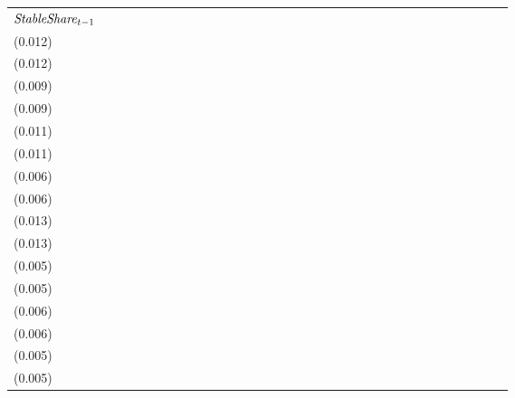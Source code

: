 \begin{tabular}{lllllllllllllllllllllllllllllllll}
${{\it StableShare}}_{t-1}$  &                                     &                                     &   \makecell{$0.671^{**}$ \\(0.012)} &   \makecell{$0.673^{**}$ \\(0.012)} &                                    &                                    &   \makecell{$0.169^{**}$ \\(0.009)} &   \makecell{$0.169^{**}$ \\(0.009)} &                                     &                                     &  \makecell{$-0.040^{**}$ \\(0.011)} &  \makecell{$-0.041^{**}$ \\(0.011)} &                                     &                                     &    \makecell{$-0.007^{}$ \\(0.006)} &    \makecell{$-0.007^{}$ \\(0.006)} &                                     &                                     &   \makecell{$-0.032^{*}$ \\(0.013)} &  \makecell{$-0.033^{**}$ \\(0.013)} &                                     &                                     &   \makecell{$-0.002^{}$ \\(0.005)} &   \makecell{$-0.002^{}$ \\(0.005)} &                                     &                                     &   \makecell{$0.448^{**}$ \\(0.006)} &  \makecell{$0.448^{**}$ \\(0.006)} &                                    &                                    &  \makecell{$0.117^{**}$ \\(0.005)} &  \makecell{$0.117^{**}$ \\(0.005)} \\

\end{tabular}
